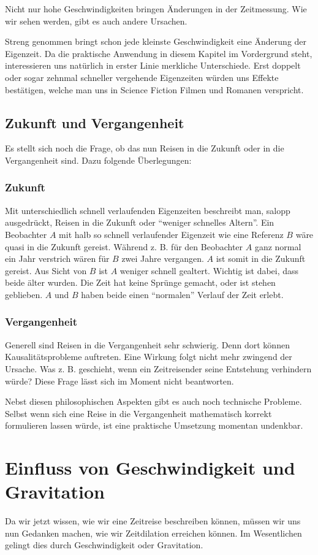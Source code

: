 \begin{refsection}
Nicht nur hohe Geschwindigkeiten bringen Änderungen in der Zeitmessung. Wie wir sehen werden, gibt es auch andere Ursachen.

Streng genommen bringt schon jede kleinste Geschwindigkeit eine Änderung der Eigenzeit. Da die praktische Anwendung in diesem Kapitel im Vordergrund steht, interessieren uns natürlich in erster Linie merkliche Unterschiede. Erst doppelt oder sogar zehnmal schneller vergehende Eigenzeiten würden uns Effekte bestätigen, welche man uns in Science Fiction Filmen und Romanen verspricht.

\subsection{Zukunft und Vergangenheit}
Es stellt sich noch die Frage, ob das nun Reisen in die Zukunft oder in die Vergangenheit sind. Dazu folgende Überlegungen:

\subsubsection{Zukunft}
Mit unterschiedlich schnell verlaufenden Eigenzeiten beschreibt man, salopp ausgedrückt, Reisen in die Zukunft oder ``weniger schnelles Altern''. Ein Beobachter $A$ mit halb so schnell verlaufender Eigenzeit wie eine Referenz $B$ wäre quasi in die Zukunft gereist.
Während z. B. für den Beobachter $A$ ganz normal ein Jahr verstrich wären für $B$ zwei Jahre vergangen. $A$ ist somit in die Zukunft gereist. Aus Sicht von $B$ ist $A$ weniger schnell gealtert. Wichtig ist dabei, dass beide älter wurden. Die Zeit hat keine Sprünge gemacht, oder ist stehen geblieben. $A$ und $B$ haben beide einen ``normalen'' Verlauf der Zeit erlebt.

\subsubsection{Vergangenheit}
Generell sind Reisen in die Vergangenheit sehr schwierig. Denn dort können Kausalitätsprobleme auftreten. Eine Wirkung folgt nicht mehr zwingend der Ursache. Was z. B. geschieht, wenn ein Zeitreisender seine Entstehung verhindern würde? Diese Frage lässt sich im Moment nicht beantworten. 

Nebst diesen philosophischen Aspekten gibt es auch noch technische Probleme. Selbst wenn sich eine Reise in die Vergangenheit mathematisch korrekt formulieren lassen würde, ist eine praktische Umsetzung momentan undenkbar.

\section{Einfluss von Geschwindigkeit und Gravitation}
Da wir jetzt wissen, wie wir eine Zeitreise beschreiben können, müssen wir uns nun Gedanken machen, wie wir Zeitdilation erreichen können. Im Wesentlichen gelingt dies durch Geschwindigkeit oder Gravitation. 

\end{refsection}
